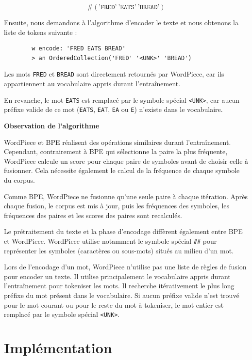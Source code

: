 \documentclass[12pt,a4paper]{report}
\begin{document}
	\[
	\#(\texttt{'FRED'}\ \texttt{'EATS'}\ \texttt{'BREAD'})
	\]
	
	Ensuite, nous demandons à l’algorithme d’encoder le texte et nous obtenons la liste de tokens suivante :
	
	\begin{verbatim}
		w encode: 'FRED EATS BREAD'
		> an OrderedCollection('FRED' '<UNK>' 'BREAD')
	\end{verbatim}
	
	Les mots \texttt{FRED} et \texttt{BREAD} sont directement retournés par WordPiece, car ils appartiennent au vocabulaire appris durant l’entraînement.
	
	En revanche, le mot \texttt{EATS} est remplacé par le symbole spécial \texttt{<UNK>}, car aucun préfixe valide de ce mot (\texttt{EATS}, \texttt{EAT}, \texttt{EA} ou \texttt{E}) n’existe dans le vocabulaire.
	
	\textbf{Observation de l'algorithme}
	
	WordPiece et BPE réalisent des opérations similaires durant l’entraînement. Cependant, contrairement à BPE qui sélectionne la paire la plus fréquente, WordPiece calcule un score pour chaque paire de symboles avant de choisir celle à fusionner. Cela nécessite également le calcul de la fréquence de chaque symbole du corpus.
	
	Comme BPE, WordPiece ne fusionne qu’une seule paire à chaque itération. Après chaque fusion, le corpus est mis à jour, puis les fréquences des symboles, les fréquences des paires et les scores des paires sont recalculés.
	
	Le prétraitement du texte et la phase d’encodage diffèrent également entre BPE et WordPiece. WordPiece utilise notamment le symbole spécial \texttt{\#\#} pour représenter les symboles (caractères ou sous-mots) situés au milieu d’un mot.
	
	Lors de l’encodage d’un mot, WordPiece n’utilise pas une liste de règles de fusion pour encoder un texte. Il utilise principalement le vocabulaire appris durant l’entraînement pour tokeniser les mots. Il recherche itérativement le plus long préfixe du mot présent dans le vocabulaire. Si aucun préfixe valide n’est trouvé pour le mot courant ou pour le reste du mot à tokeniser, le mot entier est remplacé par le symbole spécial \texttt{<UNK>}.
	
	\section{Implémentation}
	
\end{document}
